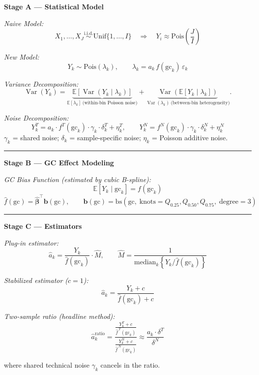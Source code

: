 \documentclass{article}
\begin{document}
\noindent\textbf{Stage A — Statistical Model}

\medskip
\noindent\textit{Naive Model:}
\[
X_1,\ldots,X_J \overset{\mathrm{i.i.d.}}{\sim} \mathrm{Unif}\{1,\ldots,I\}
\quad\Longrightarrow\quad
Y_i \approx \mathrm{Pois}\!\left(\frac{J}{I}\right)
\]

\noindent\textit{New Model:}
\[
Y_k \sim \mathrm{Pois}(\lambda_k),
\qquad
\lambda_k = a_k\,f(\mathrm{gc}_k)\,\varepsilon_k
\]

\noindent\textit{Variance Decomposition:}
\[
\operatorname{Var}(Y_k)
=
\underbrace{\mathbb{E}\!\left[\operatorname{Var}(Y_k\mid\lambda_k)\right]}_{\mathbb{E}[\lambda_k]\ \text{(within-bin Poisson noise)}}
+
\underbrace{\operatorname{Var}\!\left(\mathbb{E}[Y_k\mid\lambda_k]\right)}_{\operatorname{Var}(\lambda_k)\ \text{(between-bin heterogeneity)}}.
\]

\noindent\textit{Noise Decomposition:}
\[
Y_k^T = a_k \cdot f^T(\mathrm{gc}_k) \cdot \gamma_k \cdot \delta_k^T + \eta_k^T,
\qquad
Y_k^N = f^N(\mathrm{gc}_k) \cdot \gamma_k \cdot \delta_k^N + \eta_k^N
\]
$\gamma_k$ = shared noise; $\delta_k$ = sample-specific noise; $\eta_k$ = Poisson additive noise.



\bigskip\hrule\bigskip

\noindent\textbf{Stage B — GC Effect Modeling}

\medskip
\noindent\textit{GC Bias Function (estimated by cubic B-spline):}
\[
\mathbb{E}[Y_k \mid \mathrm{gc}_k] = f(\mathrm{gc}_k)
\]
\[
\hat{f}(\mathrm{gc}) = \hat{\boldsymbol{\beta}}^\top \mathbf{b}(\mathrm{gc}),
\qquad
\mathbf{b}(\mathrm{gc}) = \mathrm{bs}\!\left(\mathrm{gc},\;
  \mathrm{knots} = Q_{0.25}, Q_{0.50}, Q_{0.75},\;
  \mathrm{degree} = 3\right)
\]

\bigskip\hrule\bigskip

\noindent\textbf{Stage C — Estimators}

\medskip
\noindent\textit{Plug-in estimator:}
\[
\hat{a}_k = \frac{Y_k}{\hat{f}(\mathrm{gc}_k)}\cdot\hat{M},
\qquad \hat{M} = \frac{1}{\mathrm{median}_k\!\left\{Y_k/\hat{f}(\mathrm{gc}_k)\right\}}
\]

\noindent\textit{Stabilized estimator ($c=1$):}
\[
\hat{a}_k = \frac{Y_k + c}{\hat{f}(\mathrm{gc}_k) + c}
\]

\noindent\textit{Two-sample ratio (headline method):}
\[
\hat{a}_k^{\mathrm{ratio}}
= \frac{\displaystyle\frac{Y_k^T + c}{\hat{f}^{\,T}(\mathrm{gc}_k)}}{\displaystyle\frac{Y_k^N + c}{\hat{f}^{\,N}(\mathrm{gc}_k)}}
\approx \frac{a_k \cdot \delta^T}{\delta^N}
\]

\noindent where shared technical noise $\gamma_k$ cancels in the ratio.
\end{document}
